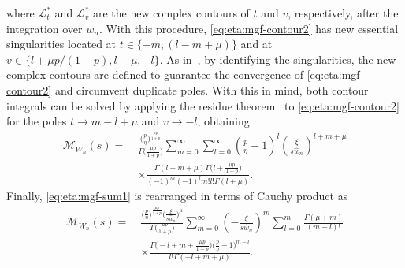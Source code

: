 \documentclass[journal,twocolumn]{IEEEtran}
\begin{document}
where $\mathcal{L}_t^{*}$ and $\mathcal{L}_v^{*}$ are the new complex contours of $t$ and $v$, respectively, after the integration over $w_n$. With this procedure, \eqref{eq:eta:mgf-contour2} has new essential singularities located at $t \in \{-m, (l-m+\mu)\}$ and at $v \in \{l+\mu p/(1+p),l+\mu,-l \}$. As in~\cite{Alm23a}, by identifying the singularities, the new complex contours are defined to guarantee the convergence of \eqref{eq:eta:mgf-contour2} and circumvent duplicate poles. With this in mind, both contour integrals can be solved by applying the residue theorem~\cite[Eq.~(16.3.6)]{Kre10} to \eqref{eq:eta:mgf-contour2} for the poles $t \to m-l+\mu$ and $v\to -l$, obtaining
\begin{align}
       \mathcal{M}_{W_n}(s) = \ & \frac{\big(\frac{p}{\eta }\big)^{\frac{\mu  p}{1+p}}}{\Gamma \big(\frac{\mu  p}{1+p}\big)}    \sum _{m=0}^{\infty } \sum _{l=0}^{\infty } \left(\frac{p}{\eta }-1\right)^l \left(\frac{\xi }{s \hat{w}_n }\right)^{l+m+\mu } \nonumber \\
       & \times \frac{\Gamma (l+m+\mu ) \Gamma \big(l+\frac{\mu p }{1+p}\big)}{(-1)^m (-1)^l m! l! \Gamma (l+\mu )} . \label{eq:eta:mgf-sum1}
\end{align}
Finally, \eqref{eq:eta:mgf-sum1} is rearranged in terms of Cauchy product as
\begin{align}
        \mathcal{M}_{W_n}(s) = \ & \frac{\big(\frac{p}{\eta }\big)^{\frac{\mu  p}{1+p}} \big(\frac{\xi}{ s \hat{w}_n }\big)^{\mu }}{\Gamma \big(\frac{\mu  p}{1+p}\big)}   \sum _{m=0}^{\infty } \left(-\frac{\xi}{ s \hat{w}_n}\right)^m  \sum _{l=0}^m \frac{\Gamma (\mu +m)}{(m-l)!}\nonumber \\
& \times \frac{\Gamma \big(-l+m+\frac{\mu p }{1+p}\big)\big(\frac{p}{\eta }-1\big)^{m-l}}{l! \Gamma (-l+m+\mu )}. \label{eq:eta:mgf-sum2}
\end{align}
\end{document}
